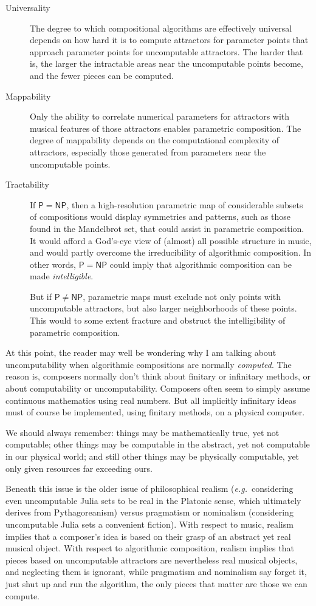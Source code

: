 \documentclass[11pt,papersize=a4]{scrartcl}
\begin{document}
\begin{description}
\item[Universality] The degree to which compositional algorithms are effectively universal depends on how hard it is to compute attractors for parameter points that approach parameter points for uncomputable attractors. The harder that is, the larger the intractable areas near the uncomputable points become, and the fewer pieces can be computed.
\item[Mappability] Only the ability to correlate numerical parameters for attractors with musical features of those attractors enables parametric composition. The degree of mappability depends on the computational complexity of attractors, especially those generated from parameters near the uncomputable points.
\item[Tractability] If $\mathsf{P} = \mathsf{NP}$, then a high-resolution parametric map of considerable subsets of compositions would display symmetries and patterns, such as those found in the Mandelbrot set, that could assist in parametric composition. It would afford a God's-eye view of (almost) all possible structure in music, and would partly overcome the irreducibility of algorithmic composition. In other words, $\mathsf{P} = \mathsf{NP}$ could imply that algorithmic composition can be made \emph{intelligible}.

But if $\mathsf{P} \ne \mathsf{NP}$, parametric maps must exclude not only points with uncomputable attractors, but also larger neighborhoods of these points. This would to some extent fracture and obstruct the intelligibility of parametric composition.
\end{description}

At this point, the reader may well be wondering why I am talking about uncomputability when algorithmic compositions are normally \emph{computed}. The reason is, composers normally don't think about finitary or infinitary methods, or about computability or uncomputability. Composers often seem to simply assume continuous mathematics using real numbers. But all implicitly infinitary ideas must of course be implemented, using finitary methods, on a physical computer. 

We should always remember: things may be mathematically true, yet not computable; other things may be computable in the abstract, yet not computable in our physical world; and still other things may be physically computable, yet only given resources far exceeding ours. 

Beneath this issue is the older issue of philosophical realism (\emph{e.g.}\ considering even uncomputable Julia sets to be real in the Platonic sense, which ultimately derives from Pythagoreanism) versus pragmatism or nominalism (considering uncomputable Julia sets a convenient fiction). With respect to music, realism implies that a composer's idea is based on their grasp of an abstract yet real musical object. With respect to algorithmic composition, realism implies that pieces based on uncomputable attractors are nevertheless real musical objects, and neglecting them is ignorant, while pragmatism and nominalism say forget it, just shut up and run the algorithm, the only pieces that matter are those we can compute.
\end{document}
